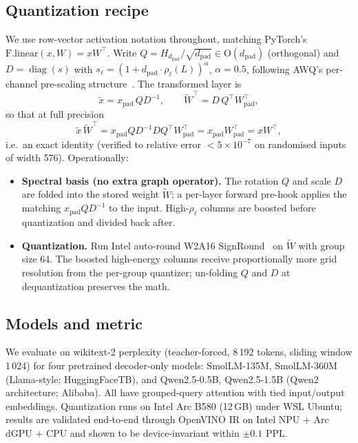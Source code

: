 \documentclass[11pt]{article}
\DeclareMathOperator*{\diag}{diag}
\begin{document}
\subsection{Quantization recipe}
We use row-vector activation notation throughout, matching PyTorch's $\mathrm{F.linear}(x, W) = x W^\top$. Write $Q = H_{d_{\text{pad}}}/\sqrt{d_{\text{pad}}} \in \mathrm{O}(d_{\text{pad}})$ (orthogonal) and $D = \diag(s)$ with $s_\ell = (1 + d_{\text{pad}} \cdot \rho_\ell(L))^\alpha$, $\alpha = 0.5$, following AWQ's per-channel pre-scaling structure~\cite{lin2024awq}. The transformed layer is
\begin{equation}
    \widetilde{x} = x_{\text{pad}}\, Q D^{-1}, \qquad
    \widetilde{W}^{\top} = D\, Q^\top W_{\text{pad}}^\top,
\end{equation}
so that at full precision
\begin{equation}
    \widetilde{x}\,\widetilde{W}^{\top}
    = x_{\text{pad}} Q D^{-1} D Q^\top W_{\text{pad}}^\top
    = x_{\text{pad}} W_{\text{pad}}^\top
    = x W^\top,
\end{equation}
i.e.\ an exact identity (verified to relative error $< 5\times 10^{-7}$ on randomised inputs of width 576). Operationally:
\begin{itemize}
    \item \textbf{Spectral basis (no extra graph operator).} The rotation $Q$ and scale $D$ are folded into the stored weight $\widetilde{W}$; a per-layer forward pre-hook applies the matching $x_{\text{pad}} Q D^{-1}$ to the input. High-$\rho_\ell$ columns are boosted before quantization and divided back after.
    \item \textbf{Quantization.} Run Intel auto-round W2A16 SignRound~\cite{cheng2023autoround} on $\widetilde{W}$ with group size 64. The boosted high-energy columns receive proportionally more grid resolution from the per-group quantizer; un-folding $Q$ and $D$ at dequantization preserves the math.
\end{itemize}

\subsection{Models and metric}
We evaluate on wikitext-2 perplexity (teacher-forced, 8\,192 tokens, sliding window 1\,024) for four pretrained decoder-only models: SmolLM-135M, SmolLM-360M (Llama-style; HuggingFaceTB), and Qwen2.5-0.5B, Qwen2.5-1.5B (Qwen2 architecture; Alibaba). All have grouped-query attention with tied input/output embeddings. Quantization runs on Intel Arc B580 (12\,GB) under WSL Ubuntu; results are validated end-to-end through OpenVINO IR on Intel NPU + Arc dGPU + CPU and shown to be device-invariant within $\pm 0.1$ PPL.
\end{document}
